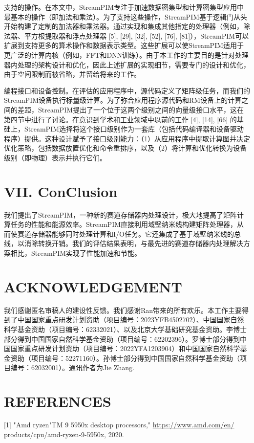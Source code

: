 \documentclass[10pt]{article}
\begin{document}
支持的操作。在本文中，StreamPIM专注于加速数据密集型和计算密集型应用中最基本的操作（即加法和乘法）。为了支持这些操作，StreamPIM基于逻辑门从头开始构建了定制的加法器和乘法器。通过实现和集成其他指定的处理器（例如，除法器、平方根提取器和浮点处理器 [5], [29], [32], [52], [76], [81]），StreamPIM可以扩展到支持更多的算术操作和数据表示类型。这些扩展可以使StreamPIM适用于更广泛的计算内核（例如，FFT和DNN训练）。由于本工作的主要目的是针对处理器内处理的架构设计和优化，因此上述扩展的实现细节，需要专门的设计和优化，由于空间限制而被省略，并留给将来的工作。

编程接口和设备控制。在评估的应用程序中，源代码定义了矩阵级任务，而我们的StreamPIM设备执行标量级计算。为了弥合应用程序源代码和RM设备上的计算之间的差距，StreamPIM提出了一个位于这两个级别之间的向量级接口水平，这在第四节中进行了讨论。在意识到学术和工业领域中以前的工作 [4], [14], [66] 的基础上，StreamPIM选择将这个接口级别作为一套库（包括代码编译器和设备驱动程序）提供。这种设计赋予了接口级别能力：（1）从应用程序中提取计算图并决定优化策略，包括数据放置优化和命令重排序，以及（2）将计算和优化转换为设备级别（即物理）表示并执行它们。

\section*{VII. ConClusion}
我们提出了StreamPIM，一种新的赛道存储器内处理设计，极大地提高了矩阵计算任务的性能和能源效率。StreamPIM直接利用域壁纳米线构建矩阵处理器，从而使赛道存储器能够同时处理计算和I/O任务。它还集成了基于域壁纳米线的总线，以消除转换开销。我们的评估结果表明，与最先进的赛道存储器内处理解决方案相比，StreamPIM实现了性能加速和节能。

\section*{ACKNOWLEDGEMENT}
我们感谢匿名审稿人的建设性反馈。我们感谢Ran带来的所有欢乐。本工作主要得到了中国国家重点研发计划资助（项目编号：2023YFB4502702）、中国国家自然科学基金资助（项目编号：62332021）、以及北京大学基础研究基金资助。李博士部分得到中国国家自然科学基金资助（项目编号：62202396）。罗博士部分得到中国国家重点研发计划资助（项目编号：2022YFA1203904）和中国国家自然科学基金资助（项目编号：52271160）。孙博士部分得到中国国家自然科学基金资助（项目编号：62032001）。通讯作者为Jie Zhang.

\section*{REFERENCES}
[1] "Amd ryzen"TM 9 5950x desktop processors," \href{https://www.amd.com/en/}{https://www.amd.com/en/} products/cpu/amd-ryzen-9-5950x, 2020.
\end{document}
